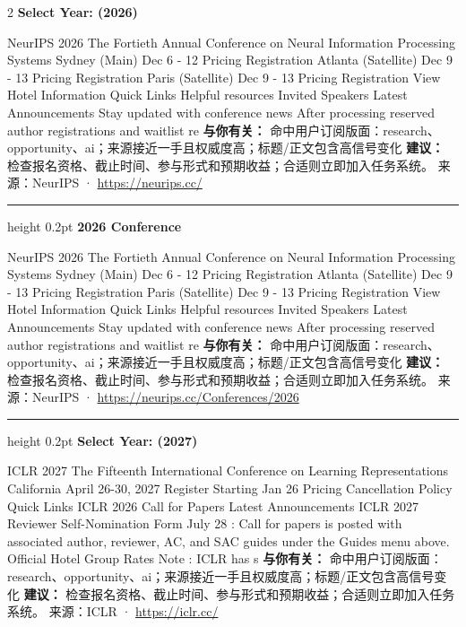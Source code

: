 \documentclass[10.5pt]{ctexart}
\begin{document}
\begin{multicols}{2}
{\large\bfseries Select Year: (2026)}\par
NeurIPS 2026 The Fortieth Annual Conference on Neural Information Processing Systems Sydney (Main) Dec 6 - 12 Pricing Registration Atlanta (Satellite) Dec 9 - 13 Pricing Registration Paris (Satellite) Dec 9 - 13 Pricing Registration View Hotel Information Quick Links Helpful resources Invited Speakers Latest Announcements Stay updated with conference news After processing reserved author registrations and waitlist re
\textbf{与你有关：} 命中用户订阅版面：research、opportunity、ai；来源接近一手且权威度高；标题/正文包含高信号变化
\textbf{建议：} 检查报名资格、截止时间、参与形式和预期收益；合适则立即加入任务系统。
{\footnotesize\color{ormuted} 来源：NeurIPS · \url{https://neurips.cc/}}
\vspace{2mm}
\hrule height 0.2pt
\vspace{2mm}
{\large\bfseries 2026 Conference}\par
NeurIPS 2026 The Fortieth Annual Conference on Neural Information Processing Systems Sydney (Main) Dec 6 - 12 Pricing Registration Atlanta (Satellite) Dec 9 - 13 Pricing Registration Paris (Satellite) Dec 9 - 13 Pricing Registration View Hotel Information Quick Links Helpful resources Invited Speakers Latest Announcements Stay updated with conference news After processing reserved author registrations and waitlist re
\textbf{与你有关：} 命中用户订阅版面：research、opportunity、ai；来源接近一手且权威度高；标题/正文包含高信号变化
\textbf{建议：} 检查报名资格、截止时间、参与形式和预期收益；合适则立即加入任务系统。
{\footnotesize\color{ormuted} 来源：NeurIPS · \url{https://neurips.cc/Conferences/2026}}
\vspace{2mm}
\hrule height 0.2pt
\vspace{2mm}
{\large\bfseries Select Year: (2027)}\par
ICLR 2027 The Fifteenth International Conference on Learning Representations California April 26-30, 2027 Register Starting Jan 26 Pricing Cancellation Policy Quick Links ICLR 2026 Call for Papers Latest Announcements ICLR 2027 Reviewer Self-Nomination Form July 28 : Call for papers is posted with associated author, reviewer, AC, and SAC guides under the Guides menu above. Official Hotel Group Rates Note : ICLR has s
\textbf{与你有关：} 命中用户订阅版面：research、opportunity、ai；来源接近一手且权威度高；标题/正文包含高信号变化
\textbf{建议：} 检查报名资格、截止时间、参与形式和预期收益；合适则立即加入任务系统。
{\footnotesize\color{ormuted} 来源：ICLR · \url{https://iclr.cc/}}

\end{multicols}
\end{document}

